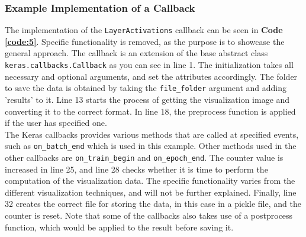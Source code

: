 
\subsubsection{Example Implementation of a Callback}

The implementation of the \texttt{LayerActivations} callback can be seen in \textbf{Code \ref{code:5}}. Specific functionality is removed, as the purpose is to showcase the general approach. The callback is an extension of the base abstract class \texttt{keras.callbacks.Callback} as you can see in line 1. The initialization takes all necessary and optional arguments, and set the attributes accordingly. The folder to save the data is obtained by taking the \texttt{file\_folder} argument and adding 'results' to it. Line 13 starts the process of getting the visualization image and converting it to the correct format. In line 18, the preprocess function is applied if the user has specified one. \\

\noindent The Keras callbacks provides various methods that are called at specified events, such as \texttt{on\_batch\_end} which is used in this example. Other methods used in the other callbacks are \texttt{on\_train\_begin} and \texttt{on\_epoch\_end}. The counter value is increased in line 25, and line 28 checks whether it is time to perform the computation of the visualization data. The specific functionality varies from the different visualization techniques, and will not be further explained. Finally, line 32 creates the correct file for storing the data, in this case in a pickle file, and the counter is reset. Note that some of the callbacks also takes use of a postprocess function, which would be applied to the result before saving it.

